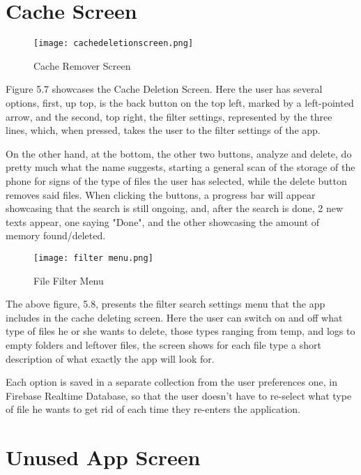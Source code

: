 \section{Cache Screen}\label{sect:Cache Screen}

\begin{figure}[htp]
    \centering
    \texttt{[image: cachedeletionscreen.png]}
    \caption{Cache Remover Screen}
    \label{fig: Cache Screen}
\end{figure}

Figure 5.7 showcases the Cache Deletion Screen. Here the user has several options, first, up top, is the back button on the top left, marked by a left-pointed arrow, and the second, top right, the filter settings, represented by the three lines, which, when pressed, takes the user to the filter settings of the app.

On the other hand, at the bottom, the other two buttons, analyze and delete, do pretty much what the name suggests, starting a general scan of the storage of the phone for signs of the type of files the user has selected, while the delete button removes said files. When clicking the buttons, a progress bar will appear showcasing that the search is still ongoing, and, after the search is done, 2 new texts appear, one saying "Done", and the other showcasing the amount of memory found/deleted.


\newpage
\begin{figure}[htp]
    \centering
    \texttt{[image: filter menu.png]}
    \caption{File Filter Menu}
    \label{fig: File Filter Menu}
\end{figure}

The above figure, 5.8, presents the filter search settings menu that the app includes in the cache deleting screen. Here the user can switch on and off what type of files he or she wants to delete, those types ranging from temp, and logs to empty folders and leftover files, the screen shows for each file type a short description of what exactly the app will look for.

Each option is saved in a separate collection from the user preferences one, in Firebase Realtime Database, so that the user doesn't have to re-select what type of file he wants to get rid of each time they re-enters the application.

\newpage
\section{Unused App Screen}\label{sect:Unused App Screen}

